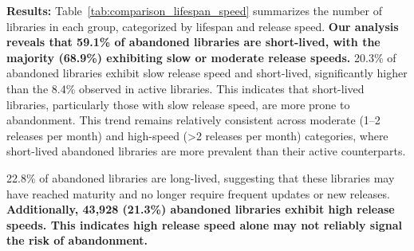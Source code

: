 
\noindent \textbf{Results:} Table~\ref{tab:comparison_lifespan_speed} summarizes the number of libraries in each group, categorized by lifespan and release speed. \textbf{Our analysis reveals that 59.1\% of abandoned libraries are short-lived, with the majority (68.9\%) exhibiting slow or moderate release speeds.} 20.3\% of abandoned libraries exhibit slow release speed and short-lived, significantly higher than the 8.4\% observed in active libraries. This indicates that short-lived libraries, particularly those with slow release speed, are more prone to abandonment. This trend remains relatively consistent across moderate (1–2 releases per month) and high-speed (\textgreater 2 releases per month) categories, where short-lived abandoned libraries are more prevalent than their active counterparts. 


22.8\% of abandoned libraries are long-lived, suggesting that these libraries may have reached maturity and no longer require frequent updates or new releases. \textbf{Additionally, 43,928 (21.3\%) abandoned libraries exhibit high release speeds. This indicates high release speed alone may not reliably signal the risk of abandonment.}







